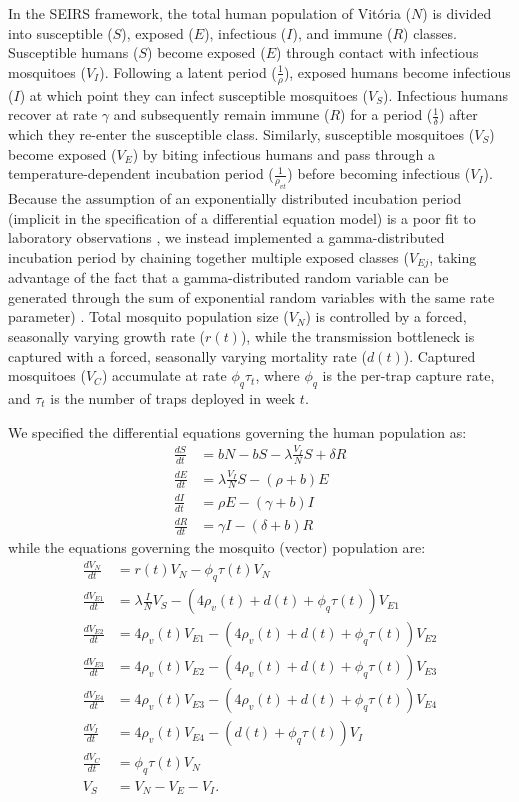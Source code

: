 \documentclass[10pt,letterpaper]{article}
\begin{document}
In the SEIRS framework, the total human population of Vit\'oria ($N$) is divided into susceptible ($S$), exposed ($E$), infectious ($I$), and immune ($R$) classes. 
Susceptible humans ($S$) become exposed ($E$) through contact with infectious mosquitoes ($V_I$).
Following a latent period ($\frac{1}{\rho}$), exposed humans become infectious ($I$) at which point they can infect susceptible mosquitoes ($V_S$).
Infectious humans recover at rate $\gamma$ and subsequently remain immune ($R$) for a period ($\frac{1}{\delta}$) after which they re-enter the susceptible class.
Similarly, susceptible mosquitoes ($V_S$) become exposed ($V_E$) by biting infectious humans and pass through a temperature-dependent incubation period ($\frac{1}{\rho_{vt}}$) before becoming infectious ($V_I$).
Because the assumption of an exponentially distributed incubation period (implicit in the specification of a differential equation model) is a poor fit to laboratory observations \cite{Chan2012}, we instead implemented a gamma-distributed incubation period by chaining together multiple exposed classes ($V_{Ej}$, taking advantage of the fact that a gamma-distributed random variable can be generated through the sum of exponential random variables with the same rate parameter) \cite{Lloyd2001}.
Total mosquito population size ($V_N$) is controlled by a forced, seasonally varying growth rate ($r(t)$), while the transmission bottleneck is captured with a forced, seasonally varying mortality rate ($d(t)$).
Captured mosquitoes ($V_C$) accumulate at rate $\phi_q \tau_t$, where $\phi_q$ is the per-trap capture rate, and $\tau_t$ is the number of traps deployed in week $t$.

We specified the differential equations governing the human population as:
\begin{align} 
\frac{dS}{dt} &= bN - bS - \lambda \frac{V_{I}}{N} S + \delta R\\
\frac{dE}{dt} &= \lambda \frac{V_{I}}{N} S - (\rho + b)E\\
\frac{dI}{dt} &= \rho E - (\gamma + b)I\\
\frac{dR}{dt} &= \gamma I - (\delta + b)R
\end{align}
while the equations governing the mosquito (vector) population are:
\begin{align}
\frac{dV_N}{dt} & = r(t) V_N - \phi_q \tau(t) V_N \\
\frac{dV_{E1}}{dt} &= \lambda \frac{I}{N} V_S - (4\rho_{v}(t) + d(t) + \phi_q \tau(t))V_{E1}\\
\frac{dV_{E2}}{dt} &= 4\rho_{v}(t) V_{E1} - (4\rho_{v}(t) + d(t) + \phi_q \tau(t))V_{E2}\\
\frac{dV_{E3}}{dt} &= 4\rho_{v}(t) V_{E2}  - (4\rho_{v}(t) + d(t) + \phi_q \tau(t))V_{E3}\\
\frac{dV_{E4}}{dt} &= 4\rho_{v}(t) V_{E3}  - (4\rho_{v}(t) + d(t) + \phi_q \tau(t))V_{E4}\\
\frac{dV_I}{dt} &= 4\rho_{v}(t) V_{E4} - (d(t) + \phi_q \tau(t)) V_I\\
\frac{dV_C}{dt} & = \phi_q \tau(t) V_N\\
V_S &= V_N - V_E - V_I.
\end{align}
\end{document}
